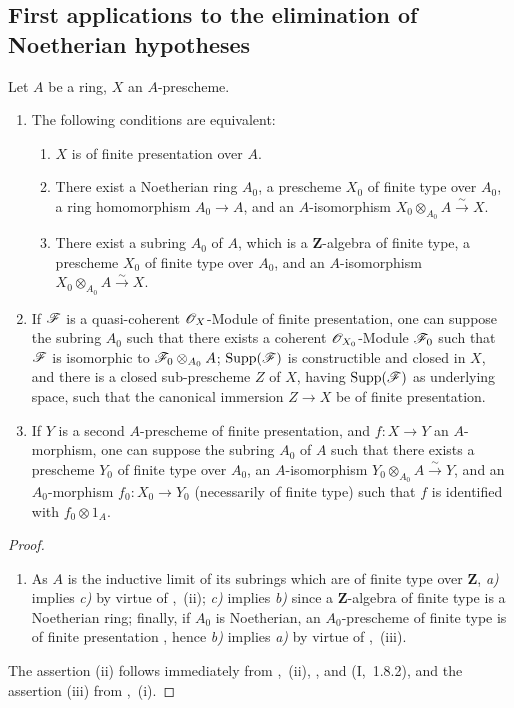 \subsection{First applications to the elimination of Noetherian hypotheses}
\label{subsection:IV.8.9}

\begin{proposition}[8.9.1]
\label{IV.8.9.1}
Let $A$ be a ring, $X$ an $A$-prescheme.
\begin{enumerate}[label=(\roman*)]
\item The following conditions are equivalent:
\begin{enumerate}[label=\emph{\alph*)}]
\item $X$ is of finite presentation over $A$.
\item There exist a Noetherian ring $A_0$, a prescheme $X_0$ of finite type over $A_0$, a ring homomorphism $A_0\to A$, and an $A$-isomorphism $X_0\otimes_{A_0}A\xrightarrow{\sim}X$.
\item There exist a subring $A_0$ of $A$, which is a $\mathbf{Z}$-algebra of finite type, a prescheme $X_0$ of finite type over $A_0$, and an $A$-isomorphism $X_0\otimes_{A_0}A\xrightarrow{\sim}X$.
\end{enumerate}
\item If $\mathscr{F}$ is a quasi-coherent $\mathscr{O}_X$-Module of finite presentation, one can suppose the subring $A_0$ such that there exists a coherent $\mathscr{O}_{X_0}$-Module $\mathscr{F}_0$ such that $\mathscr{F}$ is isomorphic to $\mathscr{F}_0\otimes_{A_0}A$; $\operatorname{Supp}(\mathscr{F})$ is constructible and closed in $X$, and there is a closed sub-prescheme $Z$ of $X$, having $\operatorname{Supp}(\mathscr{F})$ as underlying space, such that the canonical immersion $Z\to X$ be of finite presentation.
\item If $Y$ is a second $A$-prescheme of finite presentation, and $f:X\to Y$ an $A$-morphism, one can suppose the subring $A_0$ of $A$ such that there exists a prescheme $Y_0$ of finite type over $A_0$, an $A$-isomorphism $Y_0\otimes_{A_0}A\xrightarrow{\sim}Y$, and an $A_0$-morphism $f_0:X_0\to Y_0$ (necessarily of finite type) such that $f$ is identified with $f_0\otimes 1_A$.
\end{enumerate}
\end{proposition}

\begin{proof}
\begin{enumerate}[label=(\roman*)]
\item As $A$ is the inductive limit of its subrings which are of finite type over $\mathbf{Z}$, \emph{a)} implies \emph{c)} by virtue of ,~(ii); \emph{c)} implies \emph{b)} since a $\mathbf{Z}$-algebra of finite type is a Noetherian ring; finally, if $A_0$ is Noetherian, an $A_0$-prescheme of finite type is of finite presentation , hence \emph{b)} implies \emph{a)} by virtue of ,~(iii).
\end{enumerate}
The assertion (ii) follows immediately from ,~(ii), , and (I,~1.8.2), and the assertion (iii) from ,~(i).
\end{proof}


